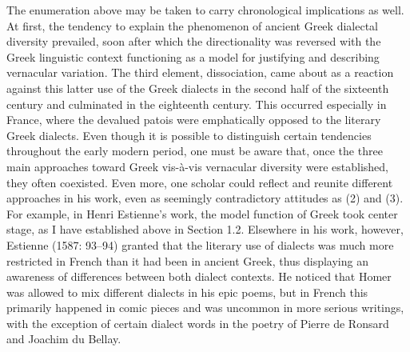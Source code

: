 \documentclass[12pt]{article}
\newenvironment{styleStandard}{\renewcommand\baselinestretch{1.25}\setlength\leftskip{0in}\setlength\rightskip{0in}\setlength\parindent{0.1972in}\setlength\parfillskip{0pt plus 1fil}\setlength\parskip{0in plus 1pt}\writerlistparindent\writerlistleftskip\leavevmode\normalfont\normalsize\writerlistlabel\ignorespaces}{\unskip\vspace{0in plus 1pt}\par}
\newcommand\writerlistleftskip{}
\newcommand\writerlistparindent{}
\newcommand\writerlistlabel{}
\begin{document}
\begin{styleStandard}
The enumeration above may be taken to carry chronological implications as well. At first, the tendency to explain the phenomenon of ancient Greek dialectal diversity prevailed, soon after which the directionality was reversed with the Greek linguistic context functioning as a model for justifying and describing vernacular variation. The third element, dissociation, came about as a reaction against this latter use of the Greek dialects in the second half of the sixteenth century and culminated in the eighteenth century. This occurred especially in France, where the devalued patois were emphatically opposed to the literary Greek dialects. Even though it is possible to distinguish certain tendencies throughout the early modern period, one must be aware that, once the three main approaches toward Greek vis-à-vis vernacular diversity were established, they often coexisted. Even more, one scholar could reflect and reunite different approaches in his work, even as seemingly contradictory attitudes as (2) and (3). For example, in Henri Estienne’s work, the model function of Greek took center stage, as I have established above in Section 1.2. Elsewhere in his work, however, Estienne (1587: 93–94) granted that the literary use of dialects was much more restricted in French than it had been in ancient Greek, thus displaying an awareness of differences between both dialect contexts. He noticed that Homer was allowed to mix different dialects in his epic poems, but in French this primarily happened in comic pieces and was uncommon in more serious writings, with the exception of certain dialect words in the poetry of Pierre de Ronsard and Joachim du Bellay.
\end{styleStandard}
\end{document}
